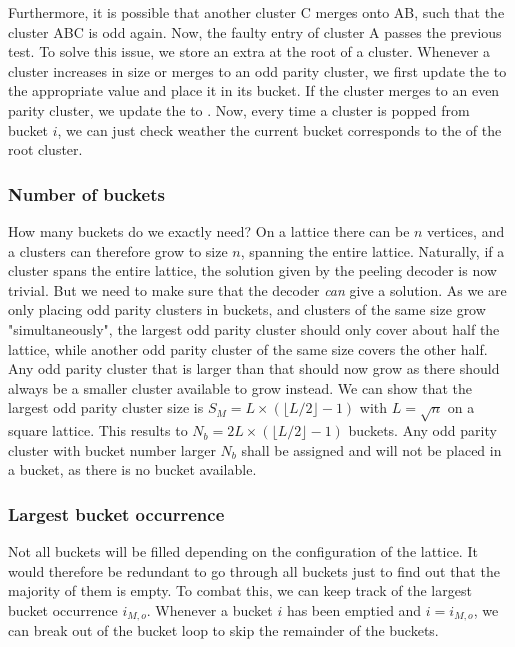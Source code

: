 Furthermore, it is possible that another cluster C merges onto AB, such that the cluster ABC is odd again. Now, the faulty entry of cluster A passes the previous test. To solve this issue, we store an extra  at the root of a cluster. Whenever a cluster increases in size or merges to an odd parity cluster, we first update the  to the appropriate value and place it in its bucket. If the cluster merges to an even parity cluster, we update the  to . Now, every time a cluster is popped from bucket $i$, we can just check weather the current bucket corresponds to the  of the root cluster.

\subsubsection{Number of buckets}
How many buckets do we exactly need? On a lattice there can be $n$ vertices, and a clusters can therefore grow to size $n$, spanning the entire lattice. Naturally, if a cluster spans the entire lattice, the solution given by the peeling decoder is now trivial. But we need to make sure that the decoder \emph{can} give a solution. As we are only placing odd parity clusters in buckets, and clusters of the same size grow "simultaneously", the largest odd parity cluster should only cover about half the lattice, while another odd parity cluster of the same size covers the other half. Any odd parity cluster that is larger than that should now grow as there should always be a smaller cluster available to grow instead. We can show that the largest odd parity cluster size is $S_M = L\times(\lfloor L/2\rfloor - 1)$ with $L=\sqrt{n}$ on a square lattice. This results to $N_b = 2L\times(\lfloor L/2\rfloor - 1)$ buckets. Any odd parity cluster with bucket number larger $N_b$ shall be assigned  and will not be placed in a bucket, as there is no bucket available.

\subsubsection{Largest bucket occurrence}
Not all buckets will be filled depending on the configuration of the lattice. It would therefore be redundant to go through all buckets just to find out that the majority of them is empty. To combat this, we can keep track of the largest bucket occurrence $i_{M,o}$. Whenever a bucket $i$ has been emptied and $i = i_{M,o}$, we can break out of the bucket loop to skip the remainder of the buckets.

